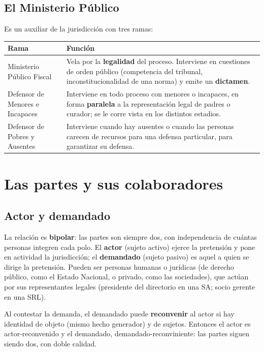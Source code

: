\documentclass[12pt,oneside]{book}
\renewcommand{\arraystretch}{1.15}
\begin{document}
\subsection{El Ministerio Público}

Es un auxiliar de la jurisdicción con tres ramas:

\begin{table}[H]
\centering
\renewcommand{\arraystretch}{1.25}
\begin{tabularx}{\textwidth}{>{\RaggedRight\arraybackslash}p{}>{\RaggedRight\arraybackslash}X}
\toprule
\textbf{Rama} & \textbf{Función} \\
\midrule
Ministerio Público Fiscal & Vela por la \textbf{legalidad} del proceso. Interviene en cuestiones de orden público (competencia del tribunal, inconstitucionalidad de una norma) y emite un \textbf{dictamen}. \\
\addlinespace
Defensor de Menores e Incapaces & Interviene en todo proceso con menores o incapaces, en forma \textbf{paralela} a la representación legal de padres o curador; se le corre vista en los distintos estadios. \\
\addlinespace
Defensor de Pobres y Ausentes & Interviene cuando hay ausentes o cuando las personas carecen de recursos para una defensa particular, para garantizar su defensa. \\
\bottomrule
\end{tabularx}
\end{table}

\section{Las partes y sus colaboradores}

\subsection{Actor y demandado}

La relación es \textbf{bipolar}: las partes son siempre dos, con independencia de cuántas personas integren cada polo. El \textbf{actor} (sujeto activo) ejerce la pretensión y pone en actividad la jurisdicción; el \textbf{demandado} (sujeto pasivo) es aquel a quien se dirige la pretensión. Pueden ser personas humanas o jurídicas (de derecho público, como el Estado Nacional, o privado, como las sociedades), que actúan por sus representantes legales (presidente del directorio en una SA; socio gerente en una SRL).

Al contestar la demanda, el demandado puede \textbf{reconvenir} al actor si hay identidad de objeto (mismo hecho generador) y de sujetos. Entonces el actor es actor-reconvenido y el demandado, demandado-reconviniente: las partes siguen siendo dos, con doble calidad.
\end{document}
